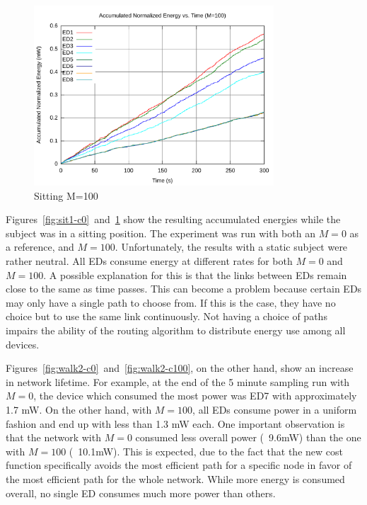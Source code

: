 \documentclass{article}
\begin{document}
\begin{figure}[!ht]
\includegraphics[width=0.8\textwidth]{figures/sit1-c100.pdf}
\caption{Sitting M=100}
\label{fig:sit1-c100}
\end{figure}

Figures~\ref{fig:sit1-c0}~and~\ref{fig:sit1-c100} show the resulting accumulated energies while the subject was in a sitting position. The experiment was run with both an $M=0$ as a reference, and $M=100$. Unfortunately, the results with a static subject were rather neutral. All EDs consume energy at different rates for both $M=0$ and $M=100$. A possible explanation for this is that the links between EDs remain close to the same as time passes. This can become a problem because certain EDs may only have a single path to choose from. If this is the case, they have no choice but to use the same link continuously. Not having a choice of paths impairs the ability of the routing algorithm to distribute energy use among all devices.

Figures~\ref{fig:walk2-c0}~and~\ref{fig:walk2-c100}, on the other hand, show an increase in network lifetime. For example, at the end of the 5 minute sampling run with $M=0$, the device which consumed the most power was ED7 with approximately 1.7 mW. On the other hand, with $M=100$, all EDs consume power in a uniform fashion and end up with less than 1.3 mW each. One important observation is that the network with $M=0$ consumed less overall power (~9.6mW) than the one with $M=100$ (~10.1mW). This is expected, due to the fact that the new cost function specifically avoids the most efficient path for a specific node in favor of the most efficient path for the whole network. While more energy is consumed overall, no single ED consumes much more power than others. 
\end{document}
